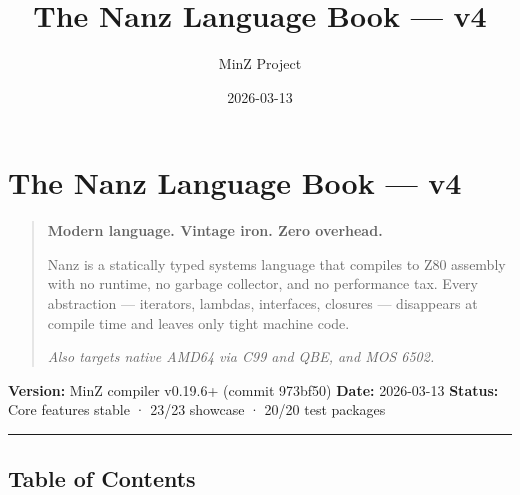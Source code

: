 \documentclass[
  11pt,
  a4paper,
]{report}
\title{The Nanz Language Book — v4}
\author{MinZ Project}
\date{2026-03-13}
\begin{document}
\maketitle

{
\hypersetup{linkcolor=}
\setcounter{tocdepth}{3}
\tableofcontents
}
\section{The Nanz Language Book --- v4}\label{the-nanz-language-book-v4}

\begin{quote}
\textbf{Modern language. Vintage iron. Zero overhead.}

Nanz is a statically typed systems language that compiles to Z80
assembly with no runtime, no garbage collector, and no performance tax.
Every abstraction --- iterators, lambdas, interfaces, closures ---
disappears at compile time and leaves only tight machine code.

\emph{Also targets native AMD64 via C99 and QBE, and MOS 6502.}
\end{quote}

\textbf{Version:} MinZ compiler v0.19.6+ (commit 973bf50) \textbf{Date:}
2026-03-13 \textbf{Status:} Core features stable · 23/23 showcase ·
20/20 test packages

\begin{center}\rule{0.5\linewidth}{0.5pt}\end{center}

\subsection{Table of Contents}\label{table-of-contents}
\end{document}
